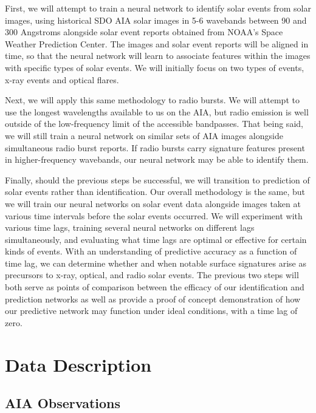 \documentclass[12pt, letterpaper]{article}
\begin{document}
First, we will attempt to train a neural network to identify solar events from solar images, using historical SDO AIA solar images in 5-6 wavebands between 90 and 300 Angstroms alongside solar event reports obtained from NOAA's Space Weather Prediction Center. The images and solar event reports will be aligned in time, so that the neural network will learn to associate features within the images with specific types of solar events. We will initially focus on two types of events, x-ray events and optical flares. 

Next, we will apply this same methodology to radio bursts. We will attempt to use the longest wavelengths available to us on the AIA, but radio emission is well outside of the low-frequency limit of the accessible bandpasses. That being said, we will still train a neural network on similar sets of AIA images alongside simultaneous radio burst reports. If radio bursts carry signature features present in higher-frequency wavebands, our neural network may be able to identify them. 

Finally, should the previous steps be successful, we will transition to prediction of solar events rather than identification. Our overall methodology is the same, but we will train our neural networks on solar event data alongside images taken at various time intervals before the solar events occurred. We will experiment with various time lags, training several neural networks on different lags simultaneously, and evaluating what time lags are optimal or effective for certain kinds of events. With an understanding of predictive accuracy as a function of time lag, we can determine whether and when notable surface signatures arise as precursors to x-ray, optical, and radio solar events. The previous two steps will both serve as points of comparison between the efficacy of our identification and prediction networks as well as provide a proof of concept demonstration of how our predictive network may function under ideal conditions, with a time lag of zero. 


\section*{Data Description}

\subsection*{AIA Observations}
\end{document}
